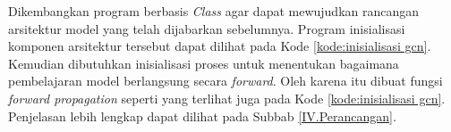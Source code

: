 Dikembangkan program berbasis \textit{Class} agar dapat mewujudkan rancangan arsitektur model yang telah dijabarkan sebelumnya. Program inisialisasi komponen arsitektur tersebut dapat dilihat pada Kode \ref{kode:inisialisasi gcn}. Kemudian dibutuhkan inisialisasi proses untuk menentukan bagaimana pembelajaran model berlangsung secara \textit{forward}. Oleh karena itu dibuat fungsi \textit{forward propagation} seperti yang terlihat juga pada Kode \ref{kode:inisialisasi gcn}. Penjelasan lebih lengkap dapat dilihat pada Subbab \ref{IV.Perancangan}. \par
 

